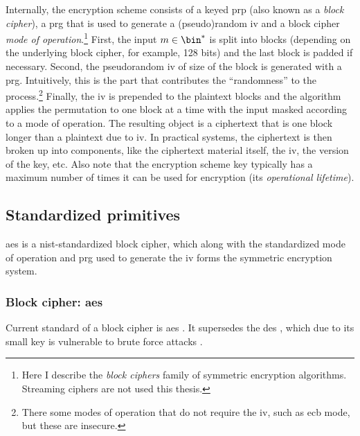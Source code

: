			Internally, the encryption scheme consists of a keyed \acrfull{prp} (also known as a \emph{block cipher}), a \acrfull{prg} that is used to generate a (pseudo)random \acrfull{iv} and a block cipher \emph{mode of operation}.\footnote{%
				Here I describe the \emph{block ciphers} family of symmetric encryption algorithms.
				Streaming ciphers are not used this thesis.
			}
			First, the input $m \in \bin^*$ is split into blocks (depending on the underlying block cipher, for example, 128 bits) and the last block is padded if necessary.
			Second, the pseudorandom \acrlong{iv} of size of the block is generated with a \acrshort{prg}.
			Intuitively, this is the part that contributes the  ``randomness'' to the process.\footnote{
				There some modes of operation that do not require the \acrlong{iv}, such as \acrfull{ecb} mode, but these are insecure.
			}
			Finally, the \acrshort{iv} is prepended to the plaintext blocks and the algorithm applies the permutation to one block at a time with the input masked according to a mode of operation.
			The resulting object is a ciphertext that is one block longer than a plaintext due to \acrshort{iv}.
			In practical systems, the ciphertext is then broken up into components, like the ciphertext material itself, the \acrshort{iv}, the version of the key, etc.
			Also note that the encryption scheme key typically has a maximum number of times it can be used for encryption (its \emph{operational lifetime}).

		\subsection{Standardized primitives}

			\acrfull{aes} is a \acrshort{nist}-standardized block cipher, which along with the standardized mode of operation and \acrshort{prg} used to generate the \acrshort{iv} forms the symmetric encryption system.

			\subsubsection{Block cipher: \texorpdfstring{\acrfull{aes}}{Advanced Encryption Standard}}

				Current standard of a block cipher is \acrfull{aes} \cite{aes-nist}.
				It supersedes the \acrfull{des} \cite{des-nist}, which due to its small key is vulnerable to brute force attacks \cite{breaking-des}.



